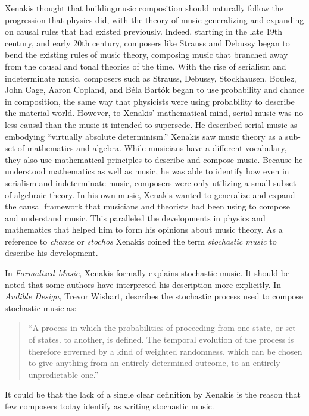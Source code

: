 Xenakis thought that  buildingmusic composition should naturally follow the
progression that physics did, with the theory of music generalizing
and expanding on causal rules that had existed previously. Indeed,
starting in the late 19th century, and early 20th century, composers
like Strauss and Debussy began to bend the existing rules of music
theory, composing music that branched away from the causal and tonal
theories of the time. With the rise of serialism and
indeterminate music, composers such as Strauss, Debussy,
Stockhausen, Boulez, John Cage, Aaron Copland, and B\'{e}la Bart\'{o}k
began to use probability and chance in composition, the same way that
physicists were using probability to describe the material
world. However, to Xenakis' mathematical mind, serial music was no
less causal than the music it intended to supersede. He described
serial music as embodying ``virtually absolute
determinism.''\cite{xenakis1992formalized} Xenakis saw music theory as
a sub-set of mathematics and algebra. While musicians have a different
vocabulary, they also use mathematical principles to describe and
compose music. Because he understood mathematics as well as music, he
was able to identify how even in serialism and indeterminate music,
composers were only utilizing a small subset of algebraic theory. In
his own music, Xenakis wanted to generalize and expand the causal
framework that musicians and theorists had been using to compose and
understand music. This paralleled the developments in physics and
mathematics that helped him to form his opinions about music theory.
As a reference to \emph{chance} or \emph{stochos} Xenakis coined the term
\emph{stochastic music} to describe his development.

In \textit{Formalized Music}, Xenakis formally explains stochastic
music. It should be noted that some authors have interpreted his
description more explicitly. In \textit{Audible Design}, Trevor
Wishart, describes the stochastic process used to compose stochastic
music as:
\begin{quotation}
  ``A process in which the probabilities of proceeding from one state,
  or set of states. to another, is defined. The temporal evolution of
  the process is therefore governed by a kind of weighted
  randomness. which can be chosen to give anything from an entirely
  determined outcome, to an entirely unpredictable
  one.''\cite{Wishart1994}
\end{quotation}
It could be that the lack of a single clear definition by Xenakis is
the reason that few composers today identify as writing stochastic
music.

